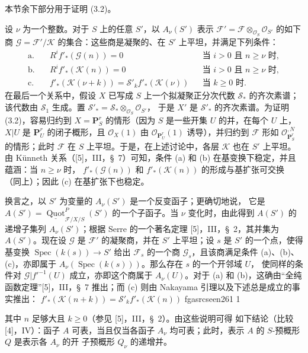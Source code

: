 \documentclass[12pt,twoside,openany]{book}
\numberwithin{equation}{section}
\newcommand{\fgaunitid}{unbound}
\newcommand{\src}[1]{%
  \phantomsection
  \hypertarget{src:\fgaunitid:#1}{}%
  \hypertarget{fga.\fgaunitid.p#1}{}%
  \ifcsname fgasrcseen#1\endcsname\else
    \expandafter\gdef\csname fgasrcseen#1\endcsname{1}%
    \hypertarget{src:#1}{}%
  \fi
  \marginpar{\raggedleft\footnotesize\sffamily #1}%
}
\theoremstyle{plain}
\theoremstyle{definition}
\theoremstyle{remark}
\begin{document}
本节余下部分用于证明 (3.2)。

设 $\nu$ 为一个整数。对于 $S$ 上的任意 $S'$，以 $A_\nu(S')$
表示 $\mathcal F'=\mathcal F\otimes_{\mathcal O_S}\mathcal O_{S'}$
的如下商
$\mathcal G=\mathcal F'/\mathcal K$ 的集合：这些商是凝聚的、在
$S'$ 上平坦，并满足下列条件：
\begin{align*}
\text{a.}\quad &R^if'_*(\mathcal G(n))=0 &&\text{当 $i>0$ 且 $n\geq\nu$ 时},\\
\text{b.}\quad &R^if'_*(\mathcal K(n))=0 &&\text{当 $i>0$ 且 $n\geq\nu$ 时},\\
\text{c.}\quad &f'_*(\mathcal K(\nu+k))
=\mathcal S'_k f'_*(\mathcal K(\nu)) &&\text{当 $k\geq0$ 时}.
\end{align*}
在最后一个关系中，假设 $X$ 已写成 $S$ 上一个拟凝聚正分次代数
$\mathcal S_*$ 的齐次素谱；该代数由 $\mathcal S_1$ 生成。置
$\mathcal S'_* =\mathcal S_*\otimes_{\mathcal O_S}\mathcal O_{S'}$，
于是 $X'$ 是 $\mathcal S'_*$ 的齐次素谱。为证明 (3.2)，容易归约到
$X=\mathbf P^r_S$ 的情形（因为 $S$ 是一些开集 $U$ 的并，在每个
$U$ 上，$X|U$ 是 $\mathbf P^r_U$ 的闭子概形，且
$\mathcal O_X(1)$ 由 $\mathcal O_{\mathbf P^r_U}(1)$ 诱导），并归约到
$\mathcal F$ 形如 $\mathcal O_{\mathbf P^r_S}^{,N}$ 的情形；此时
$\mathcal F$ 在 $S$ 上平坦。于是，在上述讨论中，各层 $\mathcal K$
也在 $S'$ 上平坦。由 Künneth 关系（[5]，III，\S~7）可知，条件
(a) 和 (b) 在基变换下稳定，并且蕴涵：当 $n\geq\nu$ 时，
$f'_*(\mathcal G(n))$ 和 $f'_*(\mathcal K(n))$ 的形成与基扩张可交换
（同上）；因此 (c) 在基扩张下也稳定。

换言之，以 $S'$ 为变量的 $A_\nu(S')$ 是一个反变函子；更确切地说，
它是
$A(S')=\underline{\operatorname{Quot}}^P_{\mathcal F/X/S}(S')$
的一个子函子。当 $\nu$ 变化时，由此得到 $A(S')$ 的递增子集列
$A_\nu(S')$；根据 Serre 的一个著名定理 [5]，III，\S~2，其并集为
$A(S')$。现在设 $\mathcal G$ 是 $\mathcal F'$ 的凝聚商，并在 $S'$
上平坦；设 $s$ 是 $S'$ 的一个点，使得基变换
$\operatorname{Spec}(k(s))\longrightarrow S'$ 给出 $\mathcal F_s$
的一个商 $\mathcal G_s$，且该商满足条件 (a)、(b)、(c)，亦即属于
$A_\nu(\operatorname{Spec}(k(s)))$。那么存在 $s$ 的一个开邻域 $U$，
使同样的条件对 $\mathcal G|f'^{-1}(U)$ 成立，亦即这个商属于
$A_\nu(U)$。对于 (a) 和 (b)，这确由“全纯函数定理”[5]，III，\S~7
推出；而 (c) 则由 Nakayama 引理以及下述总是成立的事实推出：
$f'_*(\mathcal K(n+k))=\mathcal S'_k f'_*(\mathcal K(n))$
\src{261}
其中 $n$ 足够大且 $k\geq0$（参见 [5]，III，\S~2）。由这些说明可得
如下结论（比较 [4]，IV）：函子 $A$ 可表，当且仅当各函子 $A_\nu$
均可表；此时，表示 $A$ 的 $S$-预概形 $Q$ 是表示各 $A_\nu$ 的开
子预概形 $Q_\nu$ 的递增并。
\end{document}
